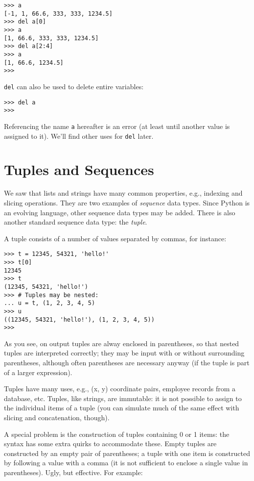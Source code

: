 \bcode\begin{verbatim}
>>> a
[-1, 1, 66.6, 333, 333, 1234.5]
>>> del a[0]
>>> a
[1, 66.6, 333, 333, 1234.5]
>>> del a[2:4]
>>> a
[1, 66.6, 1234.5]
>>>
\end{verbatim}\ecode
%
{\tt del} can also be used to delete entire variables:

\bcode\begin{verbatim}
>>> del a
>>>
\end{verbatim}\ecode
%
Referencing the name {\tt a} hereafter is an error (at least until
another value is assigned to it).  We'll find other uses for {\tt del}
later.

\section{Tuples and Sequences}

We saw that lists and strings have many common properties, e.g.,
indexing and slicing operations.  They are two examples of {\em
sequence} data types.  Since Python is an evolving language, other
sequence data types may be added.  There is also another standard
sequence data type: the {\em tuple}.

A tuple consists of a number of values separated by commas, for
instance:

\bcode\begin{verbatim}
>>> t = 12345, 54321, 'hello!'
>>> t[0]
12345
>>> t
(12345, 54321, 'hello!')
>>> # Tuples may be nested:
... u = t, (1, 2, 3, 4, 5)
>>> u
((12345, 54321, 'hello!'), (1, 2, 3, 4, 5))
>>>
\end{verbatim}\ecode
%
As you see, on output tuples are alway enclosed in parentheses, so
that nested tuples are interpreted correctly; they may be input with
or without surrounding parentheses, although often parentheses are
necessary anyway (if the tuple is part of a larger expression).

Tuples have many uses, e.g., (x, y) coordinate pairs, employee records
from a database, etc.  Tuples, like strings, are immutable: it is not
possible to assign to the individual items of a tuple (you can
simulate much of the same effect with slicing and concatenation,
though).

A special problem is the construction of tuples containing 0 or 1
items: the syntax has some extra quirks to accommodate these.  Empty
tuples are constructed by an empty pair of parentheses; a tuple with
one item is constructed by following a value with a comma
(it is not sufficient to enclose a single value in parentheses).
Ugly, but effective.  For example:

